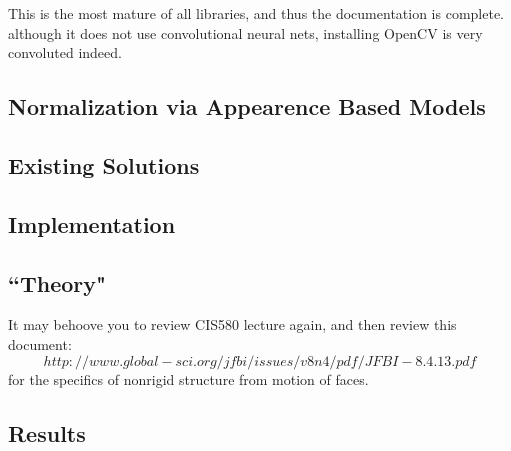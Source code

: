 This is the most mature of all libraries, and thus the documentation is complete. although it does not use convolutional neural nets, installing OpenCV is very convoluted indeed. 

\subsection{Normalization via Appearence Based Models}


\subsection{Existing Solutions}


\subsection{Implementation}


\subsection{``Theory"}

It may behoove you to review CIS580 lecture again, and then review this document:
	\[
		http://www.global-sci.org/jfbi/issues/v8n4/pdf/JFBI-8.4.13.pdf
	\]
for the specifics of nonrigid structure from motion of faces.


\subsection{Results}



